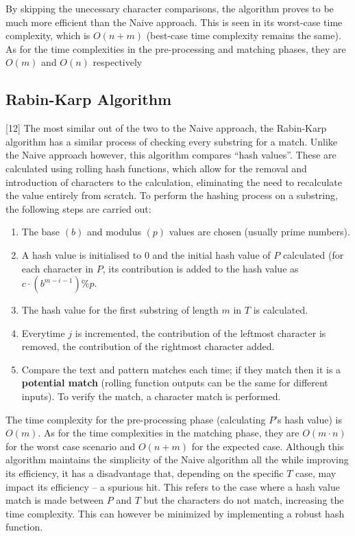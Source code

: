 \documentclass[12pt]{article}
\begin{document}
By skipping the unecessary character comparisons, the algorithm proves to be much
more efficient than the Naive approach. This is seen in its worst-case time complexity,
which is $O(n + m)$ (best-case time complexity remains the same). As for the time complexities in the pre-processing and matching phases, they are $O(m)$ and $O(n)$ respectively

\subsection{Rabin-Karp Algorithm}

[12] The most similar out of the two to the Naive approach, the Rabin-Karp algorithm
has a similar process of checking every substring for a match. Unlike the Naive approach
however, this algorithm compares “hash values”. These are calculated using rolling hash
functions, which allow for the removal and introduction of characters to the calculation,
eliminating the need to recalculate the value entirely from scratch. To perform the hashing
process on a substring, the following steps are carried out:

\begin{question}
\begin{enumerate}
	\item The base $(b)$ and modulus $(p)$ values are chosen (usually prime numbers).
	\item A hash value is initialised to 0 and the initial hash value of $P$ calculated (for each character in $P$, its contribution is added to the hash value as $c \cdot (b^{m-i-1}) \% p$.
	\item The hash value for the first substring of length $m$ in $T$ is calculated.
	\item Everytime $j$ is incremented, the contribution of the leftmost character is removed, the contribution of the rightmost character added.
	\item Compare the text and pattern matches each time; if they match then it is a \textbf{potential match} (rolling function outputs can be the same for different inputs). To verify the match, a character match is performed.
	
\end{enumerate}
\end{question}

The time complexity for the pre-processing phase (calculating $P$'s hash value) is $O(m)$.
As for the time complexities in the matching phase, they are $O(m \cdot n)$ for the worst case
scenario and $O(n + m)$ for the expected case. Although this algorithm maintains the
simplicity of the Naive algorithm all the while improving its efficiency, it has a disadvantage that, depending on the specific $T$ case, may impact its efficiency -- a spurious
hit. This refers to the case where a hash value match is made between $P$ and $T$ but the
characters do not match, increasing the time complexity. This can however be minimized
by implementing a robust hash function.
\end{document}
